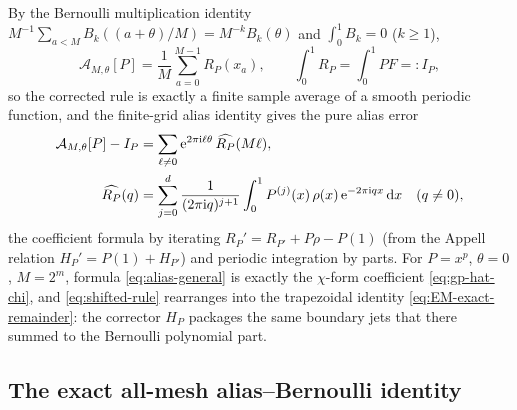 \documentclass[11pt,oneside]{article}
\numberwithin{equation}{section}
\theoremstyle{definition}
\theoremstyle{remark}
\newcommand{\dd}{\,\mathrm d}
\newcommand{\e}{\mathrm e}
\newcommand{\ii}{\mathrm i}
\begin{document}
By the Bernoulli multiplication identity
$M^{-1}\sum_{a<M}B_k((a+\theta)/M)=M^{-k}B_k(\theta)$ and
$\int_0^1B_k=0$ ($k\ge1$),
\begin{equation}
 \mathcal A_{M,\theta}[P]=\frac1M\sum_{a=0}^{M-1}R_P(x_a),
 \qquad
 \int_0^1R_P=\int_0^1PF=:I_P,
 \label{eq:periodized-average}
\end{equation}
so the corrected rule is exactly a finite sample average of a smooth
periodic function, and the finite-grid alias identity gives the pure
alias error
\begin{align}
 \mathcal A_{M,\theta}[P]-I_P
 &=\sum_{\ell\ne0}\e^{2\pi\ii\ell\theta}\,\widehat{R_P}(M\ell),
 \notag\\
 \widehat{R_P}(q)
 &=\sum_{j=0}^{d}\frac{1}{(2\pi\ii q)^{j+1}}
 \int_0^1P^{(j)}(x)\,\rho(x)\,\e^{-2\pi\ii qx}\dd x
 \quad(q\ne0),
 \label{eq:alias-general}
\end{align}
the coefficient formula by iterating $R_P'=R_{P'}+P\rho-P(1)$ (from the
Appell relation $H_P'=P(1)+H_{P'}$) and periodic integration by parts.
For $P=x^{p}$, $\theta=0$, $M=2^{m}$, formula \eqref{eq:alias-general}
is exactly the $\chi$-form coefficient
\eqref{eq:gp-hat-chi}, and \eqref{eq:shifted-rule} rearranges into the
trapezoidal identity \eqref{eq:EM-exact-remainder}: the corrector
$H_P$ packages the same boundary jets that there summed to the
Bernoulli polynomial part.

\subsection{The exact all-mesh alias--Bernoulli identity}
\end{document}

